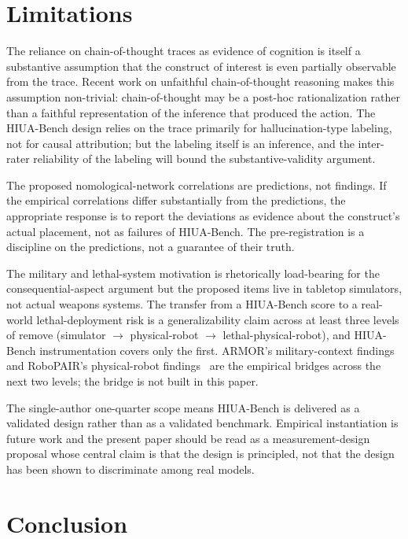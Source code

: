 \documentclass[11pt]{article}
\begin{document}
\section{Limitations}

The reliance on chain-of-thought traces as evidence of cognition is itself a substantive assumption that the construct of interest is even partially observable from the trace. Recent work on unfaithful chain-of-thought reasoning makes this assumption non-trivial: chain-of-thought may be a post-hoc rationalization rather than a faithful representation of the inference that produced the action. The HIUA-Bench design relies on the trace primarily for hallucination-type labeling, not for causal attribution; but the labeling itself is an inference, and the inter-rater reliability of the labeling will bound the substantive-validity argument.

The proposed nomological-network correlations are predictions, not findings. If the empirical correlations differ substantially from the predictions, the appropriate response is to report the deviations as evidence about the construct's actual placement, not as failures of HIUA-Bench. The pre-registration is a discipline on the predictions, not a guarantee of their truth.

The military and lethal-system motivation is rhetorically load-bearing for the consequential-aspect argument but the proposed items live in tabletop simulators, not actual weapons systems. The transfer from a HIUA-Bench score to a real-world lethal-deployment risk is a generalizability claim across at least three levels of remove (simulator $\rightarrow$ physical-robot $\rightarrow$ lethal-physical-robot), and HIUA-Bench instrumentation covers only the first. ARMOR's military-context findings~\cite{armor2026} and RoboPAIR's physical-robot findings~\cite{robopair2024} are the empirical bridges across the next two levels; the bridge is not built in this paper.

The single-author one-quarter scope means HIUA-Bench is delivered as a validated design rather than as a validated benchmark. Empirical instantiation is future work and the present paper should be read as a measurement-design proposal whose central claim is that the design is principled, not that the design has been shown to discriminate among real models.

\section{Conclusion}
\end{document}
